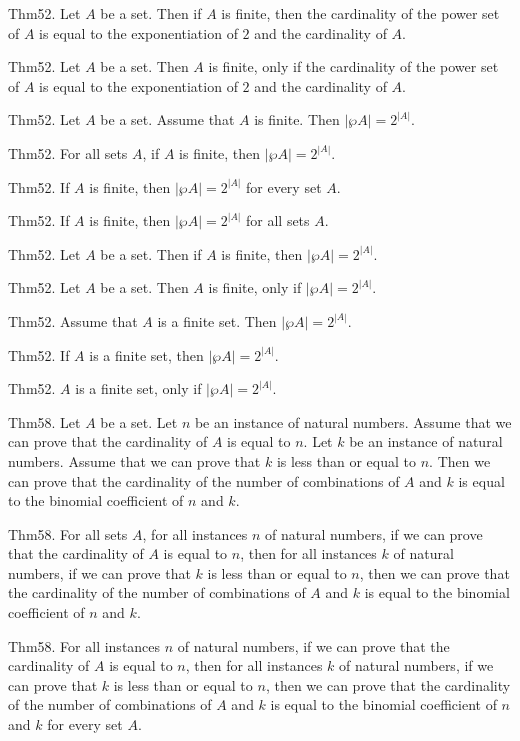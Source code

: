 \documentclass{article}
\begin{document}
Thm52. Let $A$ be a set. Then if $A$ is finite, then the cardinality of the power set of $A$ is equal to the exponentiation of $2$ and the cardinality of $A$.

Thm52. Let $A$ be a set. Then $A$ is finite, only if the cardinality of the power set of $A$ is equal to the exponentiation of $2$ and the cardinality of $A$.

Thm52. Let $A$ be a set. Assume that $A$ is finite. Then $| \wp A | = 2 ^ {| A |}$.

Thm52. For all sets $A$, if $A$ is finite, then $| \wp A | = 2 ^ {| A |}$.

Thm52. If $A$ is finite, then $| \wp A | = 2 ^ {| A |}$ for every set $A$.

Thm52. If $A$ is finite, then $| \wp A | = 2 ^ {| A |}$ for all sets $A$.

Thm52. Let $A$ be a set. Then if $A$ is finite, then $| \wp A | = 2 ^ {| A |}$.

Thm52. Let $A$ be a set. Then $A$ is finite, only if $| \wp A | = 2 ^ {| A |}$.

Thm52. Assume that $A$ is a finite set. Then $| \wp A | = 2 ^ {| A |}$.

Thm52. If $A$ is a finite set, then $| \wp A | = 2 ^ {| A |}$.

Thm52. $A$ is a finite set, only if $| \wp A | = 2 ^ {| A |}$.

Thm58. Let $A$ be a set. Let $n$ be an instance of natural numbers. Assume that we can prove that the cardinality of $A$ is equal to $n$. Let $k$ be an instance of natural numbers. Assume that we can prove that $k$ is less than or equal to $n$. Then we can prove that the cardinality of the number of combinations of $A$ and $k$ is equal to the binomial coefficient of $n$ and $k$.

Thm58. For all sets $A$, for all instances $n$ of natural numbers, if we can prove that the cardinality of $A$ is equal to $n$, then for all instances $k$ of natural numbers, if we can prove that $k$ is less than or equal to $n$, then we can prove that the cardinality of the number of combinations of $A$ and $k$ is equal to the binomial coefficient of $n$ and $k$.

Thm58. For all instances $n$ of natural numbers, if we can prove that the cardinality of $A$ is equal to $n$, then for all instances $k$ of natural numbers, if we can prove that $k$ is less than or equal to $n$, then we can prove that the cardinality of the number of combinations of $A$ and $k$ is equal to the binomial coefficient of $n$ and $k$ for every set $A$.
\end{document}
